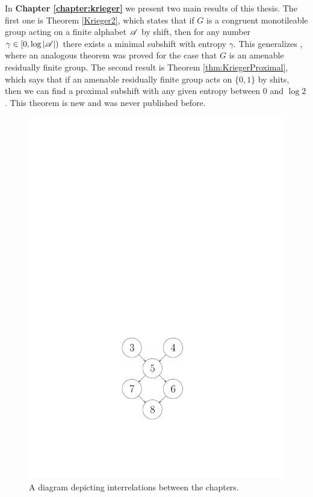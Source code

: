 In {\bf Chapter \ref{chapter:krieger}} we present two main results of this thesis. The first one is Theorem \ref{Krieger2}, which states that if $G$ is a congruent monotileable group acting on a finite alphabet $\mathscr{A}$ by shift, then for any number $\gamma\in[0,\log|\mathscr{A}|)$ there exists a minimal subshift with entropy $\gamma$. This generalizes \cite{LS18}, where an analogous theorem was proved for the case that $G$ is an amenable residually finite group. The second result is Theorem \ref{thm:KriegerProximal}, which says that if an amenable residually finite group acts on $\{0,1\}$ by shits, then we can find a proximal subshift with any given entropy between $0$ and $\log2$. This theorem is new and was never published before.
\bigskip\bigskip\bigskip
\begin{figure}[H]
\centering
\includegraphics[scale=1]{Graphics/chapters}
\caption{A diagram depicting interrelations between the chapters.}\label{fig:chapters}
\end{figure}



